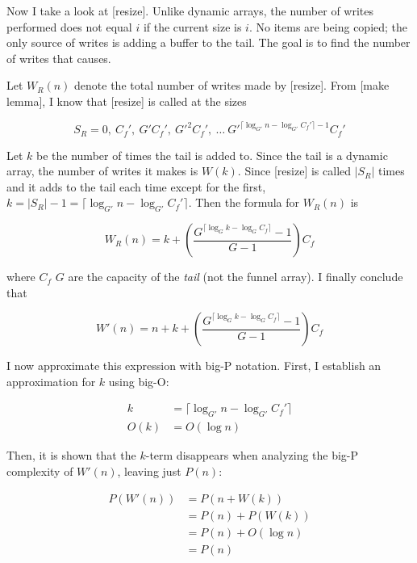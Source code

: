 \documentclass{article}
\newcommand{\nwritesfn}{W}
\newcommand{\nwritesnewfn}{\nwritesfn'}
\newcommand{\nwritesresizefn}{W_R}
\newcommand{\bigo}{O}
\newcommand{\biggo}{P}
\newcommand{\varnitems}{n}
\newcommand{\initcapacity}{C_f}
\newcommand{\growthfactor}{G}
\newcommand{\initcapacitynew}{\initcapacity'}
\newcommand{\growthfactornew}{\growthfactor'}
\begin{document}
	Now I take a look at [resize]. Unlike dynamic arrays, the number of writes performed does not equal $i$ if the current size is $i$. No items are being copied; the only source of writes is adding a buffer to the tail. The goal is to find the number of writes that causes.
	
	Let $\nwritesresizefn(n)$ denote the total number of writes made by [resize]. From [make lemma], I know that [resize] is called at the sizes
	
	$$
	S_R = 0,\ \initcapacitynew,\ \growthfactornew\initcapacitynew,\ \growthfactornew^2\initcapacitynew,\ \ldots\ \growthfactornew^{\lceil \log_{\growthfactornew} \varnitems - \log_{\growthfactornew} \initcapacitynew \rceil - 1}\initcapacitynew
	$$
	
	Let $k$ be the number of times the tail is added to. Since the tail is a dynamic array, the number of writes it makes is $\nwritesfn(k)$. Since [resize] is called $|S_R|$ times and it adds to the tail each time except for the first, $k = |S_R| - 1 = \lceil \log_{\growthfactornew} \varnitems - \log_{\growthfactornew} \initcapacitynew \rceil$. Then the formula for $\nwritesresizefn(n)$ is
	
	$$
	\nwritesresizefn(n) = k + \left( \frac{\growthfactor^{\lceil \log_{\growthfactor} k - \log_{\growthfactor} \initcapacity \rceil} - 1}{\growthfactor - 1} \right) \initcapacity
	$$
	
	where $\initcapacity$ $\growthfactor$ are the capacity of the \textit{tail} (not the funnel array). I finally conclude that
	
	$$
	\nwritesnewfn(n) = n + k + \left( \frac{\growthfactor^{\lceil \log_{\growthfactor} k - \log_{\growthfactor} \initcapacity \rceil} - 1}{\growthfactor - 1} \right) \initcapacity
	$$
	
	I now approximate this expression with big-P notation. First, I establish an approximation for $k$ using big-O:
	
	\begin{align*}
	k &= \lceil \log_{\growthfactornew} \varnitems - \log_{\growthfactornew} \initcapacitynew \rceil\\
	\bigo(k) &= \bigo(\log \varnitems)
	\end{align*}
	
	Then, it is shown that the $k$-term disappears when analyzing the big-P complexity of $\nwritesnewfn(\varnitems)$, leaving just $\biggo(\varnitems)$:
	
	\begin{align*}
	\biggo(\nwritesnewfn(\varnitems)) &= \biggo(\varnitems + \nwritesfn(k))\\
	&= \biggo(\varnitems) + \biggo(\nwritesfn(k))\\
	&= \biggo(\varnitems) + \bigo(\log \varnitems)\\
	&= \biggo(\varnitems)
	\end{align*}
	
\end{document}
